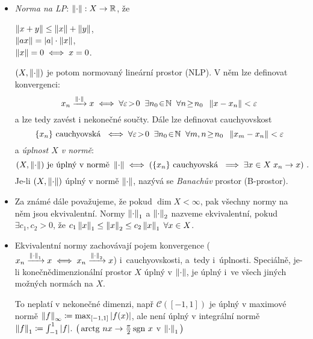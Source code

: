 \begin{itemize}
    \item \emph{Norma na LP}: \hspace{1em}
    $\left\lVert\cdot\right\rVert: X \to \mathbb{R}$, že \parbox[t]{20em}{
        $\left\lVert x+y\right\rVert \leq \left\lVert x\right\rVert + \left\lVert y\right\rVert$, \\[3pt]
        $\left\lVert ax\right\rVert = |a| \cdot \left\lVert x\right\rVert$, \\[3pt]
        $\left\lVert x\right\rVert = 0 \iff x = 0$.
    }
    
    $(X, \left\lVert\cdot\right\rVert)$ je potom normovaný lineární prostor (NLP). V něm lze definovat konvergenci:
    $$
        x_n \xrightarrow{\left\lVert\cdot\right\rVert} x
        \iff
        \forall \varepsilon \! > \! 0 \;\;
        \exists n_0 \!\in\! \mathbb{N} \;\;
        \forall n \!\geq\! n_0 \;\;
        \left\lVert x - x_n\right\rVert < \varepsilon
    $$
    a lze tedy zavést i nekonečné součty.
    Dále lze definovat cauchyovskost
    $$
        \{ x_n \} \text{ cauchyovská }
        \iff
        \forall \varepsilon \! > \! 0 \;\;
        \exists n_0 \!\in\! \mathbb{N} \;\;
        \forall m,n \!\geq\! n_0 \;\;
        \left\lVert x_m - x_n\right\rVert < \varepsilon
    $$
    a \emph{úplnost $X$ v normě}:
    $$
        (X, \left\lVert\cdot\right\rVert) \text{ je úplný v normě } \left\lVert\cdot\right\rVert
        \iff
        \left(
        \{ x_n \} \text{ cauchyovská }
        \implies
        \exists x \in X \; x_n \to x
        \right)\,.
    $$
    Je-li $(X, \left\lVert\cdot\right\rVert)$ úplný v normě $\left\lVert\cdot\right\rVert$, nazývá se \emph{Banachův} prostor (B-prostor).
    
    \item Za známé dále považujeme, že pokud $\dim X < \infty$, pak všechny normy na něm jsou ekvivalentní. Normy $\left\lVert\cdot\right\rVert_1$ a $\left\lVert\cdot\right\rVert_2$ nazveme ekvivalentní, pokud $\exists c_1, c_2 > 0$, že
    $c_1 \left\lVert x\right\rVert_1 \leq \left\lVert x\right\rVert_2 \leq c_2 \left\lVert x\right\rVert_1 \; \forall x \in X$.
    
    \item Ekvivalentní normy zachovávají pojem konvergence ($x_n \xrightarrow{\left\lVert\cdot\right\rVert_1} x \iff x_n \xrightarrow{\left\lVert\cdot\right\rVert_2} x$) i~cauchyovskosti, a~tedy i~úplnosti. Speciálně, je-li konečnědimenzionální prostor $X$ úplný v $\left\lVert\cdot\right\rVert$, je úplný i~ve všech jiných možných normách na $X$.
    
    To neplatí v nekonečné dimenzi, např $\mathcal{C}([-1, 1])$ je úplný v maximové normě $\left\lVert f\right\rVert_\infty \coloneqq \max_{[-1, 1]} |f(x)|$, ale není úplný v integrální normě $\left\lVert f\right\rVert_1 \coloneqq \int_{-1}^1 |f|$. $\big(\operatorname{arctg}\, nx \to \frac{\pi}{2} \operatorname{sgn}\, x$ v $\left\lVert\cdot\right\rVert_1\big)$
    

\end{itemize}
